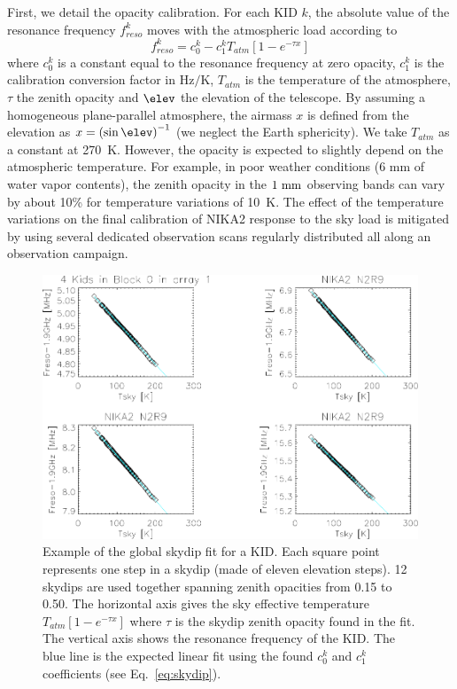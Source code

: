 First, we detail the opacity calibration. For each KID $k$, the
absolute value of the resonance frequency $f_{reso}^k$ moves with the
atmospheric load according to
%
\begin{equation}
f_{reso}^k  = c_0^k - c_1^k T_{atm}[1-e^{-\tau x}]
\label{eq:skydip}
\end{equation}
%
where $c_0^k$ is a constant equal to the resonance frequency at zero
opacity, $c_1^k$ is the calibration conversion factor in Hz$/$K,
$T_{atm}$ is the temperature of the atmosphere, $\tau$ the zenith
opacity and $\elev$ the elevation of the
telescope.  By assuming a homogeneous plane-parallel atmosphere, the
airmass $x$ is defined from the elevation as $x =
\left(\sin\elev\right)^{-1}$ (we neglect the Earth sphericity).
We take $T_{atm}$ as a constant at 270~K. However, the opacity is
expected to slightly depend on the atmospheric temperature. For
example, in poor weather conditions (6 mm of water vapor contents),
the zenith opacity in the $1~\rm{mm}$ observing bands can vary by
about 10\% for temperature variations of 10~K. The
effect of the temperature variations on the final
calibration of NIKA2 response to the sky load is mitigated by using
several dedicated observation scans regularly distributed all along an
observation campaign.
%
\begin{figure}[!htbp]
\begin{center}
\includegraphics[trim={9cm 0cm 0cm 6.5cm}, clip=true, width=0.9\linewidth]{Figures/test_allskd4_N2R9v5_5-crop.pdf}
\caption[]{Example of the global skydip fit for a KID.
Each square point represents one step in a skydip (made of eleven
elevation steps). 12 skydips are used together spanning zenith
opacities from 0.15 to 0.50. The horizontal axis gives the sky
effective temperature $T_{atm}[1-e^{-\tau x}]$ where $\tau$ is the
skydip zenith opacity found in the fit. The vertical axis shows the
resonance frequency of the KID. The blue line is the expected linear
fit using the found $c_0^k$ and $c_1^k$ coefficients (see
Eq.~\ref{eq:skydip}).}
\label{fig:skydipfitexample}
\end{center}
\end{figure}

